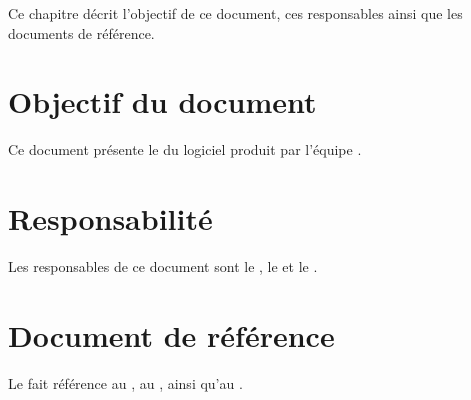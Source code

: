 
	Ce chapitre décrit l'objectif de ce document, ces responsables ainsi que les documents de référence.

\section{Objectif du document}
	Ce document présente le \PTI{} du logiciel produit par l'équipe \nomEquipe{}.
	
\section{Responsabilité}
	Les responsables de ce document sont le \CP, le \RQ{} et le \RD.
	
\section{Document de référence}
	Le \PTI{} fait référence au \JTI, au \PTU, ainsi qu'au \JTU.
